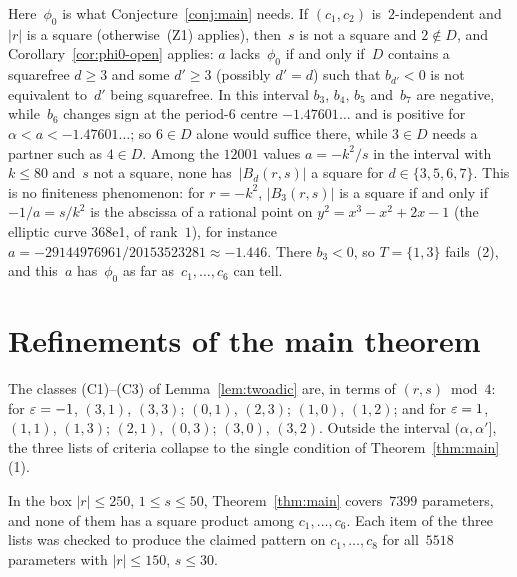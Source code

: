 \begin{remark}
  \label{rem:phi0-interval}
  Here~$\phi_0$ is what Conjecture~\ref{conj:main} needs. If $(c_1, c_2)$
  is~$2$-independent and~$|r|$ is a square (otherwise~(Z1) applies), then~$s$ is not a square
  and $2 \notin D$, and Corollary~\ref{cor:phi0-open} applies: $a$ lacks~$\phi_0$ if and only
  if~$D$ contains a squarefree $d \ge 3$ and some $d' \ge 3$ (possibly $d' = d$) such that
  $b_{d'} < 0$ is not equivalent to~$d'$ being squarefree. In this interval $b_3$, $b_4$, $b_5$
  and~$b_7$ are negative, while~$b_6$ changes sign at the period-$6$ centre $-1.47601\ldots$ and
  is positive for $\alpha < a < -1.47601\ldots$; so $6 \in D$ alone would suffice there, while
  $3 \in D$ needs a partner such as $4 \in D$. Among the
  $12001$ values $a = -k^2/s$ in the interval with $k \le 80$ and~$s$ not a square, none
  has~$|B_d(r, s)|$ a square for $d \in \{3, 5, 6, 7\}$. This is no finiteness phenomenon: for
  $r = -k^2$, $|B_3(r, s)|$ is a square if and only if $-1/a = s/k^2$ is the abscissa of a rational
  point on $y^2 = x^3 - x^2 + 2x - 1$ (the elliptic curve 368e1, of rank~$1$), for instance
  $a = -29144976961/20153523281 \approx -1.446$. There $b_3 < 0$, so $T = \{1, 3\}$ fails~(2),
  and this~$a$ has~$\phi_0$ as far as~$c_1, \dots, c_6$ can tell.
\end{remark}

\section{Refinements of the main theorem}

The classes (C1)--(C3) of Lemma~\ref{lem:twoadic} are, in terms of $(r, s) \bmod 4$: for
$\varepsilon = -1$, $(3,1)$, $(3,3)$; $(0,1)$, $(2,3)$; $(1,0)$, $(1,2)$; and for $\varepsilon = 1$, $(1,1)$,
$(1,3)$; $(2,1)$, $(0,3)$; $(3,0)$, $(3,2)$. Outside the interval $(\alpha, \alpha']$, the three
lists of criteria collapse to the single condition of Theorem~\ref{thm:main}(1).

\begin{remark}
  In the box $|r| \le 250$, $1 \le s \le 50$, Theorem~\ref{thm:main} covers~$7399$ parameters, and
  none of them has a square product among $c_1, \dots, c_6$. Each item of the three lists was
  checked to produce the claimed pattern on $c_1, \dots, c_8$ for all~$5518$ parameters with
  $|r| \le 150$, $s \le 30$.
\end{remark}

